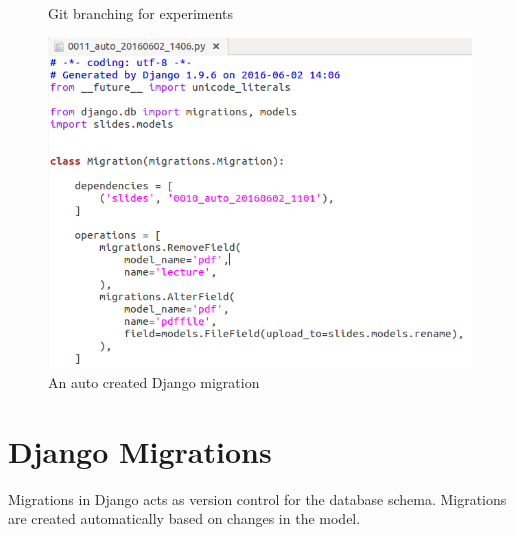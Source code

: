 \documentclass[11pt]{article}
\begin{document}
\begin{figure}[h]
\begin{minipage}{.5\textwidth}
  \caption{Git branching for experiments}
\end{minipage}%
\begin{minipage}{.5\textwidth}
  \centering
  \includegraphics[width=.7\linewidth]{migration.png}
  \caption{An auto created Django migration}
\end{minipage}
\end{figure}

\section{Django Migrations}
Migrations in Django acts as version control for the database schema. Migrations are created automatically based on changes in the model.
\end{document}

